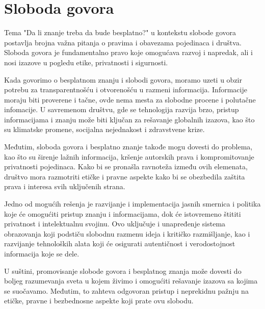 \documentclass[a4paper]{article}
\begin{document}
{\setlength{\parskip}{1em}



\section{Sloboda govora}
\label{Sloboda govora}

Tema "Da li znanje treba da bude besplatno?" u kontekstu slobode govora postavlja brojna važna pitanja o pravima i obavezama pojedinaca i društva. Sloboda govora je fundamentalno pravo koje omogućava razvoj i napredak, ali i nosi izazove u pogledu etike, privatnosti i sigurnosti.

Kada govorimo o besplatnom znanju i slobodi govora, moramo uzeti u obzir potrebu za transparentnošću i otvorenošću u razmeni informacija. Informacije moraju biti proverene i tačne, ovde nema mesta za slobodne procene i polutačne infomacije. U savremenom društvu, gde se tehnologija razvija brzo, pristup informacijama i znanju može biti ključan za rešavanje globalnih izazova, kao što su klimatske promene, socijalna nejednakost i zdravstvene krize.

Međutim, sloboda govora i besplatno znanje takođe mogu dovesti do problema, kao što su širenje lažnih informacija, kršenje autorskih prava i kompromitovanje privatnosti pojedinaca. Kako bi se pronašla ravnoteža između ovih elemenata, društvo mora razmotriti etičke i pravne aspekte kako bi se obezbedila zaštita prava i interesa svih uključenih strana.

Jedno od mogućih rešenja je razvijanje i implementacija jasnih smernica i politika koje će omogućiti pristup znanju i informacijama, dok će istovremeno štititi privatnost i intelektualnu svojinu. Ovo uključuje i unapređenje sistema obrazovanja koji podstiču slobodnu razmenu ideja i kritičko razmišljanje, kao i razvijanje tehnoloških alata koji će osigurati autentičnost i verodostojnost informacija koje se dele.

U suštini, promovisanje slobode govora i besplatnog znanja može dovesti do boljeg razumevanja sveta u kojem živimo i omogućiti rešavanje izazova sa kojima se suočavamo. Međutim, to zahteva odgovoran pristup i neprekidnu pažnju na etičke, pravne i bezbednosne aspekte koji prate ovu slobodu.


\begin{verbatim}

\end{verbatim}

}
\end{document}
